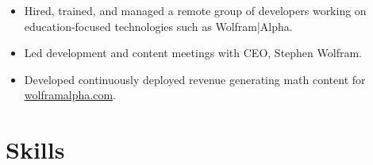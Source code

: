 \documentclass[11pt,a4paper,unicode]{moderncv}
\begin{document}
\vspace{-.1cm}
\cvline{}
{\begin{itemize} 
	  \item Hired, trained, and managed a remote group of developers working on education-focused technologies such as Wolfram|Alpha. 
	  \item Led development and content meetings with CEO, Stephen Wolfram.
 \end{itemize}}
\vspace{-.5cm}


\vspace{-.1cm}
\cvline{}
{\begin{itemize} 
	\item Developed continuously deployed revenue generating math content for \url{wolframalpha.com}.
\end{itemize}}
\vspace{-.5cm}


\section{Skills}
\end{document}
